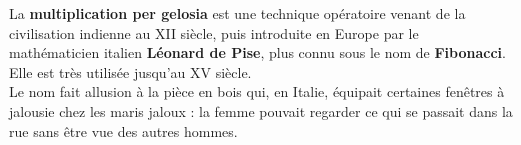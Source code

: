 \begin{changemargin}{-10mm}{-10mm}
\begin{enigme}
    La {\bf multiplication per gelosia} est une technique opératoire venant de la civilisation indienne au {\small XII} siècle, puis introduite en Europe par le mathématicien italien {\bf Léonard de Pise}, plus connu sous le nom de {\bf Fibonacci}. Elle est très utilisée jusqu'au {\small XV} siècle. \\
    Le nom fait allusion à la pièce en bois qui, en Italie, équipait certaines \og fenêtres à jalousie \fg{} chez les maris jaloux : la femme pouvait regarder ce qui se passait dans la rue sans être vue des autres hommes. \bigskip


\end{enigme}
\end{changemargin}

